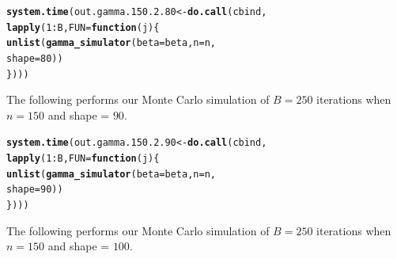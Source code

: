 \documentclass[11pt]{article}\usepackage[]{graphicx}\usepackage[]{color}
\makeatletter
\newcommand{\hlnum}[1]{\textcolor[rgb]{0.686,0.059,0.569}{#1}}%
\newcommand{\hlopt}[1]{\textcolor[rgb]{0,0,0}{#1}}%
\newcommand{\hlstd}[1]{\textcolor[rgb]{0.345,0.345,0.345}{#1}}%
\newcommand{\hlkwa}[1]{\textcolor[rgb]{0.161,0.373,0.58}{\textbf{#1}}}%
\newcommand{\hlkwb}[1]{\textcolor[rgb]{0.69,0.353,0.396}{#1}}%
\newcommand{\hlkwc}[1]{\textcolor[rgb]{0.333,0.667,0.333}{#1}}%
\newcommand{\hlkwd}[1]{\textcolor[rgb]{0.737,0.353,0.396}{\textbf{#1}}}%
\newenvironment{kframe}{%
 \def\at@end@of@kframe{}%
 \ifinner\ifhmode%
  \def\at@end@of@kframe{\end{minipage}}%
  \begin{minipage}{\columnwidth}%
 \fi\fi%
 \def\FrameCommand##1{\hskip\@totalleftmargin \hskip-\fboxsep
 \colorbox{shadecolor}{##1}\hskip-\fboxsep
     \hskip-\linewidth \hskip-\@totalleftmargin \hskip\columnwidth}%
 \MakeFramed {\advance\hsize-\width
   \@totalleftmargin\z@ \linewidth\hsize
   \@setminipage}}%
 {\par\unskip\endMakeFramed%
 \at@end@of@kframe}
\newenvironment{knitrout}{}{} %
\makeatother
\begin{document}
\begin{knitrout}
\color{fgcolor}\begin{kframe}
\begin{alltt}
\hlkwd{system.time}\hlstd{(out.gamma.150.2.80} \hlkwb{<-} \hlkwd{do.call}\hlstd{(cbind,}
  \hlkwd{lapply}\hlstd{(}\hlnum{1}\hlopt{:}\hlstd{B,} \hlkwc{FUN} \hlstd{=} \hlkwa{function}\hlstd{(}\hlkwc{j}\hlstd{)\{}
    \hlkwd{unlist}\hlstd{(}\hlkwd{gamma_simulator}\hlstd{(}\hlkwc{beta} \hlstd{= beta,} \hlkwc{n} \hlstd{= n,}
      \hlkwc{shape} \hlstd{=} \hlnum{80}\hlstd{))}
\hlstd{\})))}
\end{alltt}


{\ttfamily\noindent\bfseries\color{errorcolor}{\#\# Error in r[, l]/mad.predict.fun(out.mad, xx): non-numeric argument to binary operator}}

{\ttfamily\noindent\itshape\color{messagecolor}{\#\# Timing stopped at: 1.724 0 1.726}}\end{kframe}
\end{knitrout}


The following performs our Monte Carlo simulation of $B = 250$ iterations 
when $n = 150$ and shape = $90$.

\begin{knitrout}
\color{fgcolor}\begin{kframe}
\begin{alltt}
\hlkwd{system.time}\hlstd{(out.gamma.150.2.90} \hlkwb{<-} \hlkwd{do.call}\hlstd{(cbind,}
  \hlkwd{lapply}\hlstd{(}\hlnum{1}\hlopt{:}\hlstd{B,} \hlkwc{FUN} \hlstd{=} \hlkwa{function}\hlstd{(}\hlkwc{j}\hlstd{)\{}
    \hlkwd{unlist}\hlstd{(}\hlkwd{gamma_simulator}\hlstd{(}\hlkwc{beta} \hlstd{= beta,} \hlkwc{n} \hlstd{= n,}
      \hlkwc{shape} \hlstd{=} \hlnum{90}\hlstd{))}
\hlstd{\})))}
\end{alltt}


{\ttfamily\noindent\bfseries\color{errorcolor}{\#\# Error in r[, l]/mad.predict.fun(out.mad, xx): non-numeric argument to binary operator}}

{\ttfamily\noindent\itshape\color{messagecolor}{\#\# Timing stopped at: 1.667 0 1.669}}\end{kframe}
\end{knitrout}


The following performs our Monte Carlo simulation of $B = 250$ iterations 
when $n = 150$ and shape = $100$.
\end{document}
